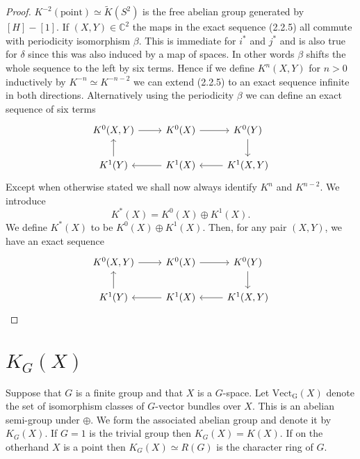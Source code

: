 \documentclass[leqno]{book}
\numberwithin{equation}{section}
\theoremstyle{definition}
\begin{document}
            \begin{proof}
              $K^{-2}(\text{point})\simeq \tilde{K}(S^{2})$ is the free abelian group generated by $[H]-[1]$. If $(X,Y)\in \mathbb{C}^{2}$ the maps in the exact sequence (2.2.5) all commute with periodicity isomorphism $\beta$. This is immediate for $i^{*}$ and $j^{*}$ and is also true for $\delta$ since this was also induced by a map of spaces. In other words $\beta$ shifts the whole sequence to the left by six terms. Hence if we define $K^{n}(X,Y)$ for $n>0$ inductively by $K^{-n}\simeq K^{-n-2}$ we can extend (2.2.5) to an exact sequence infinite in both directions. Alternatively using the periodicity $\beta$ we can define an exact sequence of six terms
              \begin{equation*}
                \begin{tikzcd}
                  K^{0}(X,Y)\arrow[r] & K^{0}(X)\arrow[r] & K^{0}(Y)\arrow[d] \\
                  K^{1}(Y)\arrow[u] & K^{1}(X)\arrow[l] & K^{1}(X,Y)\arrow[l]
                \end{tikzcd}
              \end{equation*}
              Except when otherwise stated we shall now always identify $K^{n}$ and $K^{n-2}$. We introduce
              \begin{equation*}
                K^{*}(X)=K^{0}(X)\oplus K^{1}(X).
              \end{equation*}
              We define $K^{*}(X)$ to be $K^{0}(X)\oplus K^{1}(X)$. Then, for any pair $(X,Y)$, we have an exact sequence
              \begin{equation*}
                \begin{tikzcd}
                  K^{0}(X,Y)\arrow[r] & K^{0}(X)\arrow[r] & K^{0}(Y)\arrow[d] \\
                  K^{1}(Y)\arrow[u] & K^{1}(X)\arrow[l] & K^{1}(X,Y)\arrow[l]
                \end{tikzcd}
              \end{equation*}
            \end{proof}
        
        \section{$K_{G}(X)$}
            
            Suppose that $G$ is a finite group and that $X$ is a $G$-space. Let $\operatorname{Vect_G}(X)$ denote the set of isomorphism classes of $G$-vector bundles over $X$. This is an abelian semi-group under $\oplus $. We form the associated abelian group and denote it by $K_{G}(X)$. If $G=1$ is the trivial group then $K_{G}(X)=K(X)$. If on the otherhand $X$ is a point then $K_{G}(X)\simeq R(G)$ is the character ring of $G$.
\end{document}
